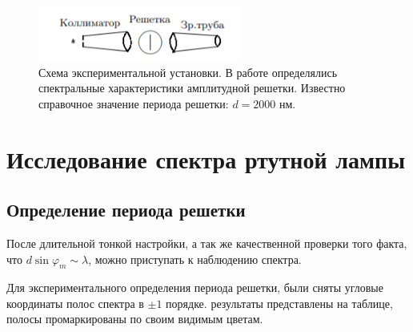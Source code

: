 \documentclass[a4paper, 14pt]{extarticle}%
\newcommand\ECaption[1]{%
     \captionsetup{font=footnotesize}%
     \caption{#1}}
\begin{document}
\begin{figure}[h!]
\begin{center}
\includegraphics[width=0.6\textwidth]{ust}
\end{center}
\ECaption{Схема экспериментальной установки. В работе определялись спектральные характеристики амплитудной решетки. Известно справочное значение периода решетки: $ d = 2000 $ нм.}
\end{figure}

\section*{Исследование спектра ртутной лампы}
\subsection*{Определение периода решетки}

После длительной тонкой настройки, а так же качественной проверки того факта, что $ d\sin\varphi_m \sim\lambda $, можно приступать к наблюдению спектра. 

Для экспериментального определения периода решетки, были сняты угловые координаты полос спектра в $ \pm 1 $ порядке. результаты представлены на таблице, полосы промаркированы по своим видимым цветам.
\end{document}
